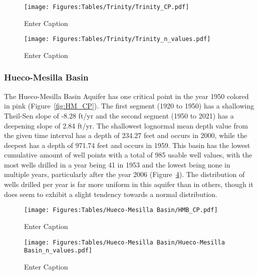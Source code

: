 \begin{figure}[H]
    \centering
    \texttt{[image: Figures:Tables/Trinity/Trinity\_CP.pdf]}
    \caption{Enter Caption}
    \label{fig:TR_CP}
\end{figure}

\begin{figure}[H]
    \centering
    \texttt{[image: Figures:Tables/Trinity/Trinity\_n\_values.pdf]}
    \caption{Enter Caption}
    \label{fig:TR_n_value}
\end{figure}

\subsubsection*{Hueco-Mesilla Basin}
The Hueco-Mesilla Basin Aquifer has one critical point in the year 1950 colored in pink (Figure~\ref{fig:HM_CP}). The first segment (1920 to 1950) has a shallowing Theil-Sen slope of -8.28 ft/yr and the second segment (1950 to 2021) has a deepening slope of 2.84 ft/yr. The shallowest lognormal mean depth value from the given time interval has a depth of 234.27 feet and occurs in 2000, while the deepest has a depth of 971.74 feet and occurs in 1959. This basin has the lowest cumulative amount of well points with a total of 985 usable well values, with the most wells drilled in a year being 41 in 1953 and the lowest being none in multiple years, particularly after the year 2006 (Figure~\ref{fig:HM_n_value}). The distribution of wells drilled per year is far more uniform in this aquifer than in others, though it does seem to exhibit a slight tendency towards a normal distribution.

\begin{figure}[H]
    \centering
    \texttt{[image: Figures:Tables/Hueco-Mesilla Basin/HMB\_CP.pdf]}
    \caption{Enter Caption}
    \label{HM_CP}
\end{figure}

\begin{figure}[H]
    \centering
    \texttt{[image: Figures:Tables/Hueco-Mesilla Basin/Hueco-Mesilla Basin\_n\_values.pdf]}
    \caption{Enter Caption}
    \label{fig:HM_n_value}
\end{figure}
